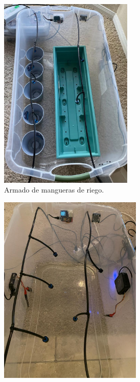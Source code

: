 \begin{figure}[htpb]
\begin{subfigure}[b]{0.45\textwidth}
		\includegraphics[width=0.70\textwidth]{./Figures/chapter4/Invernadero1.jpg}
		\caption{Armado de mangueras de riego.}
		\label{fig:gh1}
     \end{subfigure}
     \hfill
     \begin{subfigure}[b]{0.45\textwidth}
	    \centering
		 \includegraphics[width=0.75\textwidth]{./Figures/chapter4/Invernadero2.jpg}

\end{subfigure}
\end{figure}
